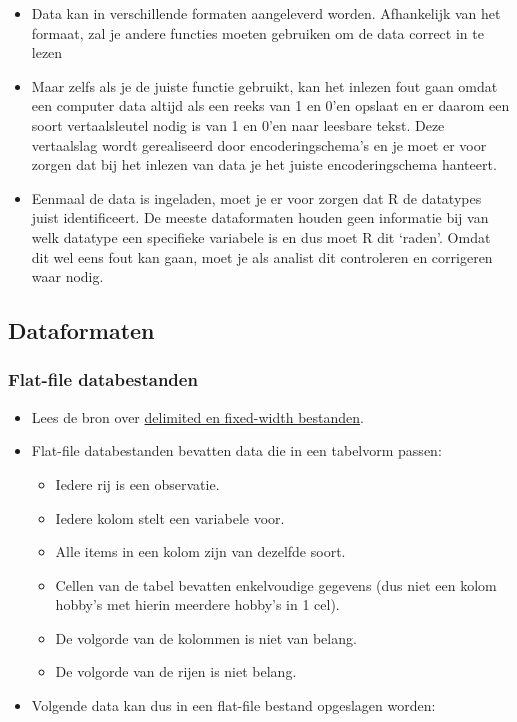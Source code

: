 \documentclass[]{tufte-book}
\providecommand{\tightlist}{%
  \setlength{\itemsep}{0pt}\setlength{\parskip}{0pt}}
\begin{document}
\begin{itemize}
\tightlist
\item
  Data kan in verschillende formaten aangeleverd worden. Afhankelijk van het formaat, zal je andere functies moeten gebruiken om de data correct in te lezen
\item
  Maar zelfs als je de juiste functie gebruikt, kan het inlezen fout gaan omdat een computer data altijd als een reeks van 1 en 0'en opslaat en er daarom een soort vertaalsleutel nodig is van 1 en 0'en naar leesbare tekst. Deze vertaalslag wordt gerealiseerd door encoderingschema's en je moet er voor zorgen dat bij het inlezen van data je het juiste encoderingschema hanteert.
\item
  Eenmaal de data is ingeladen, moet je er voor zorgen dat R de datatypes juist identificeert. De meeste dataformaten houden geen informatie bij van welk datatype een specifieke variabele is en dus moet R dit `raden'. Omdat dit wel eens fout kan gaan, moet je als analist dit controleren en corrigeren waar nodig.
\end{itemize}

\hypertarget{dataformaten}{%
\subsection{Dataformaten}\label{dataformaten}}

\hypertarget{flat-file-databestanden}{%
\subsubsection{Flat-file databestanden}\label{flat-file-databestanden}}

\begin{itemize}
\tightlist
\item
  Lees de bron over \href{https://www.techwalla.com/articles/what-is-a-delimited-a-fixed-width-file}{delimited en fixed-width bestanden}.
\item
  Flat-file databestanden bevatten data die in een tabelvorm passen:

  \begin{itemize}
  \tightlist
  \item
    Iedere rij is een observatie.
  \item
    Iedere kolom stelt een variabele voor.
  \item
    Alle items in een kolom zijn van dezelfde soort.
  \item
    Cellen van de tabel bevatten enkelvoudige gegevens (dus niet een kolom hobby's met hierin meerdere hobby's in 1 cel).
  \item
    De volgorde van de kolommen is niet van belang.
  \item
    De volgorde van de rijen is niet belang.
  \end{itemize}
\item
  Volgende data kan dus in een flat-file bestand opgeslagen worden:
\end{itemize}
\end{document}
